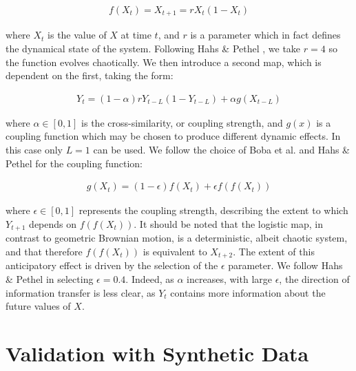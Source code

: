 \documentclass[]{rsos}%
\begin{document}
  \begin{eqnarray}
    f(X_t) = X_{t+1} = rX_t(1-X_t)    
    \label{eq:f(x)}
  \end{eqnarray}

  where $X_t$ is the value of $X$ at time $t$, and $r$ is a parameter which in fact defines the dynamical state of the system. {\color{black}Following Hahs \& Pethel \cite{hahs2011distinguishing}, we take $r=4$ so the function evolves chaotically.} We then introduce a second map, which is dependent on the first, taking the form:

  \begin{eqnarray}
    Y_{t} = (1-\alpha) rY_{t-L}(1-Y_{t-L})  + \alpha g(X_{t-L})   
    \label{eq:coupled_map}
  \end{eqnarray}

  where $ \alpha \in [0,1]$ is the cross-similarity, or coupling strength, and $g(x)$ is a coupling function which may be chosen to produce different dynamic effects. In this case only $L=1$ can be used. We follow the choice of Boba et al. \cite{boba2015efficient} and Hahs \& Pethel \cite{hahs2011distinguishing} for the coupling function:

  \begin{eqnarray}
    g(X_t) = (1-\epsilon) f(X_t) + \epsilon f(f(X_t)) 
    \label{eq:g(x)}
  \end{eqnarray}


 where $\epsilon \in [0,1]$ represents the coupling strength, describing the extent to which $Y_{t+1}$ depends on $f(f(X_t))$. It should be noted that the logistic map, in contrast to geometric Brownian motion, is a deterministic, albeit chaotic system, and that therefore $f(f(X_t))$ is equivalent to $X_{t+2}$. {\color{black} The extent of this anticipatory effect is driven by the selection of the $\epsilon$ parameter. We follow Hahs \& Pethel in selecting $\epsilon=0.4$. Indeed, as $\alpha$ increases, with large $\epsilon$, the direction of information transfer is less clear, as $Y_t$ contains more information about the future values of $X$. }



\section{Validation with Synthetic Data} \label{s.validation}
\end{document}
